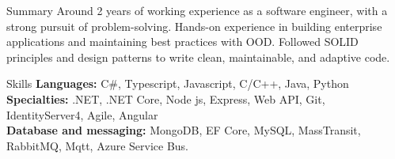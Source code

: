 \documentclass{resume}
\begin{document}

\begin{rSection}{Summary}
Around 2 years of working experience as a software engineer, with a strong pursuit of problem-solving.
Hands-on experience in building enterprise applications and maintaining best practices with OOD.
Followed SOLID principles and design patterns to write clean, maintainable, and adaptive code.
\end{rSection}


\begin{rSection}{Skills}
{\bf Languages:} C\#, Typescript, Javascript, C/C++, Java, Python\\
{\bf Specialties:} .NET, .NET Core, Node js, Express, Web API, Git, IdentityServer4, Agile, Angular\\
{\bf Database and messaging:} MongoDB, EF Core, MySQL, MassTransit, RabbitMQ, Mqtt, Azure Service Bus.
\end{rSection}

\end{document}

